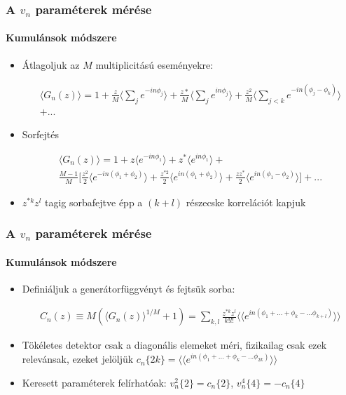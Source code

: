 \documentclass{beamer}
\begin{document}
\begin{frame}
\frametitle{A $v_n$ paraméterek mérése}
\framesubtitle{Kumulánsok módszere}
\begin{itemize}
\item Átlagoljuk az $M$ multiplicitású eseményekre:
\begin{center}
\begin{align*}
\langle G_n(z)\rangle=1+\frac{z}{M}\Big\langle\sum_{j} e^{-in\phi_j}\Big\rangle+\frac{z*}{M}\Big\langle\sum_{j} e^{in\phi_j}\Big\rangle+\frac{z^2}{M}\Big\langle\sum_{j<k} e^{-in(\phi_j-\phi_k)}\Big\rangle\\+...
\end{align*}
\end{center}
\item Sorfejtés
\begin{center}
\begin{align*}
\langle G_n(z)\rangle =1+z\langle e^{-in\phi_1}\rangle +z^{*}\langle e^{in\phi_1}\rangle +\\ \frac{M-1}{M}\Big[\frac{z^2}{2}\langle e^{-in(\phi_1+\phi_2)}\rangle+\frac{z^{*2}}{2}\langle e^{in(\phi_1+\phi_2)}\rangle+\frac{zz^*}{2}\langle e^{in(\phi_1-\phi_2)}\rangle\Big]+...
\end{align*}
\end{center}
\item $z^{*k}z^l$ tagig sorbafejtve épp a $(k+l)$ részecske korrelációt kapjuk
\end{itemize}
\end{frame}

\begin{frame}
\frametitle{A $v_n$ paraméterek mérése}
\framesubtitle{Kumulánsok módszere}
\begin{itemize}
\item Definiáljuk a generátorfüggvényt és fejtsük sorba:
\begin{center}
\begin{align*}
C_n(z)\equiv  M(\langle G_n(z)\rangle^{1/M}+1)=\sum_{k,l}\frac{z^{*k}z^{l}}{k!l!}\langle\langle e^{in(\phi_1+...+\phi_k-...\phi_{k+l})}\rangle\rangle
\end{align*}
\end{center}
\item Tökéletes detektor csak a diagonális elemeket méri, fizikailag csak ezek relevánsak, ezeket jelöljük $c_n\{2k\}=\langle\langle e^{in(\phi_1+...+\phi_k-...\phi_{2k})}\rangle\rangle$
\item Keresett paraméterek felírhatóak: $v_n^2\{2\}=c_n\{2\}$, $v_n^4\{4\}=-c_n\{4\}$
\end{itemize}
\end{frame}
\end{document}
